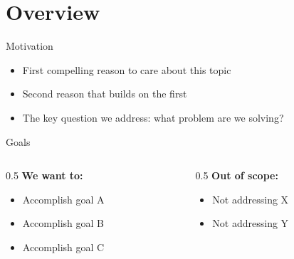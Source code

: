 \section{Overview}

\begin{frame}{Motivation}
  \begin{itemize}
    \item First compelling reason to care about this topic
    \item Second reason that builds on the first
    \item The key question we address: \alert{what problem are we solving?}
  \end{itemize}
\end{frame}

\begin{frame}{Goals}
  \begin{columns}[T]
    \begin{column}{0.5\textwidth}
      \textbf{We want to:}
      \begin{itemize}
        \item Accomplish goal A
        \item Accomplish goal B
        \item Accomplish goal C
      \end{itemize}
    \end{column}
    \begin{column}{0.5\textwidth}
      \textbf{Out of scope:}
      \begin{itemize}
        \item Not addressing X
        \item Not addressing Y
      \end{itemize}
    \end{column}
  \end{columns}
\end{frame}
